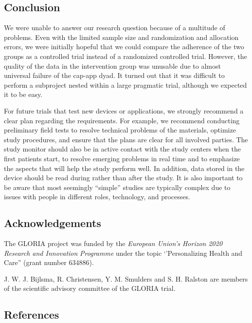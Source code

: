 \documentclass{article}
\begin{document}
\subsection{Conclusion }

We were unable to answer our research question because of a multitude of problems. Even with the limited sample size and randomization and allocation errors, we were initially hopeful that we could compare the adherence of the two groups as a controlled trial instead of a randomized controlled trial. However, the quality of the data in the intervention group was unusable due to almost universal failure of the cap-app dyad. It turned out that it was difficult to perform a subproject nested within a large pragmatic trial, although we expected it to be easy. 



For future trials that test new devices or applications, we strongly recommend a clear plan regarding the requirements. For example, we recommend conducting preliminary field tests to resolve technical problems of the materials, optimize study procedures, and ensure that the plans are clear for all involved parties. The study monitor should also be in active contact with the study centers when the first patients start, to resolve emerging problems in real time and to emphasize the aspects that will help the study perform well. In addition, data stored in the device should be read during rather than after the study. It is also important to be aware that most seemingly “simple” studies are typically complex due to issues with people in different roles, technology, and processes.



\subsection{Acknowledgements}

The GLORIA project was funded by the \emph{European Union's Horizon 2020 Research and Innovation }\emph{Programme} under the topic ‘'Personalizing Health and Care'' (grant number 634886). 

J. W. J. Bijlsma, R. Christensen, Y. M. Smulders and S. H. Ralston are members of the scientific advisory committee of the GLORIA trial. 



\subsection{References}
\end{document}
